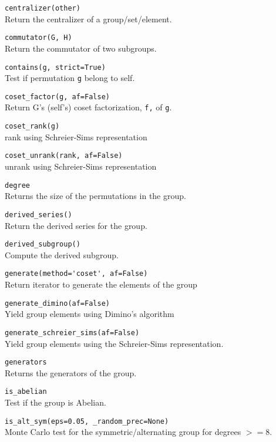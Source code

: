 \documentclass[10pt,landscape]{article}
\begin{document}
\begin{multicols}{3}
\verb!centralizer(other)!\\
Return the centralizer of a group/set/element.



\verb!commutator(G, H)!\\
Return the commutator of two subgroups.


\verb!contains(g, strict=True)!\\
Test if permutation \verb!g! belong to self.



\verb!coset_factor(g, af=False)!\\
Return G's (self's) coset factorization, \verb!f,! of \verb!g!.




\verb!coset_rank(g)!\\
rank using Schreier-Sims representation



\verb!coset_unrank(rank, af=False)!\\
unrank using Schreier-Sims representation



\verb!degree!\\
Returns the size of the permutations in the group.



\verb!derived_series()!\\
Return the derived series for the group.


\verb!derived_subgroup()!\\
Compute the derived subgroup.


\verb!generate(method='coset', af=False)!\\
Return iterator to generate the elements of the group


\verb!generate_dimino(af=False)!\\
Yield group elements using Dimino's algorithm


\verb!generate_schreier_sims(af=False)!\\
Yield group elements using the Schreier-Sims representation.



\verb!generators!\\
Returns the generators of the group.




\verb!is_abelian!\\
Test if the group is Abelian.


\verb!is_alt_sym(eps=0.05, _random_prec=None)!\\
Monte Carlo test for the symmetric/alternating group for degrees $>= 8$.




\end{multicols}
\end{document}
